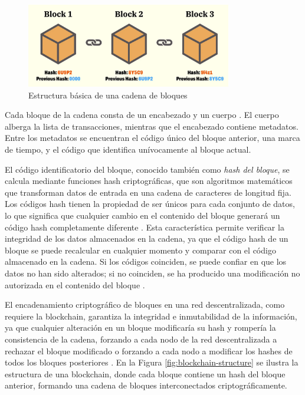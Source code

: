 \begin{figure}[!htpb]
    \centering
    \includegraphics[width=0.8\textwidth]{Figures/blockchain-basic.jpg}
    \caption{Estructura básica de una cadena de bloques}
    \label{fig:blockchain-basic}
\end{figure}

Cada bloque de la cadena consta de un encabezado y un cuerpo \cite{tripathi2023comprehensive}. El cuerpo alberga la lista de transacciones, mientras que el encabezado contiene metadatos. Entre los metadatos se encuentran el código único del bloque anterior, una marca de tiempo, y el código que identifica unívocamente al bloque actual.

El código identificatorio del bloque, conocido también como \textit{hash del bloque}, se calcula mediante funciones hash criptográficas, que son algoritmos matemáticos que transforman datos de entrada en una cadena de caracteres de longitud fija. Los códigos hash tienen la propiedad de ser únicos para cada conjunto de datos, lo que significa que cualquier cambio en el contenido del bloque generará un código hash completamente diferente \cite{pending}. Esta característica permite verificar la integridad de los datos almacenados en la cadena, ya que el código hash de un bloque se puede recalcular en cualquier momento y comparar con el código almacenado en la cadena. Si los códigos coinciden, se puede confiar en que los datos no han sido alterados; si no coinciden, se ha producido una modificación no autorizada en el contenido del bloque \cite{pending}.

El encadenamiento criptográfico de bloques en una red descentralizada, como requiere la blockchain, garantiza la integridad e inmutabilidad de la información, ya que cualquier alteración en un bloque modificaría su hash y rompería la consistencia de la cadena, forzando a cada nodo de la red descentralizada a rechazar el bloque modificado o forzando a cada nodo a modificar los hashes de todos los bloques posteriores \cite{sunny2022systematic}. En la Figura \ref{fig:blockchain-structure} se ilustra la estructura de una blockchain, donde cada bloque contiene un hash del bloque anterior, formando una cadena de bloques interconectados criptográficamente.

